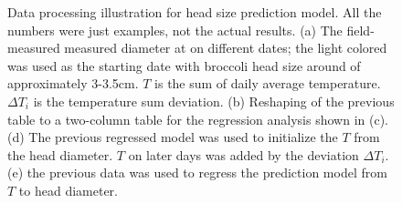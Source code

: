 \begin{figure}[htb]
  \begin{center}
  \end{center}
  \caption[Data processing illustration for head size prediction model]{
    Data processing illustration for head size prediction model. All the numbers were just examples, not the actual results. 
    (a) The field-measured measured diameter at on different dates; the light colored was used as the starting date with broccoli head size around of approximately 3-3.5cm. $T$ is the sum of daily average temperature. $\Delta T_i$ is the temperature sum deviation. 
    (b) Reshaping of the previous table to a two-column table for the regression analysis shown in (c). 
    (d) The previous regressed model was used to initialize the $T$ from the head diameter. 
    $T$ on later days was added by the deviation $\Delta T_i$. 
    (e) the previous data was used to regress the prediction model from $T$ to head diameter.
  }
  \label{fig:cp4s3}
\end{figure}